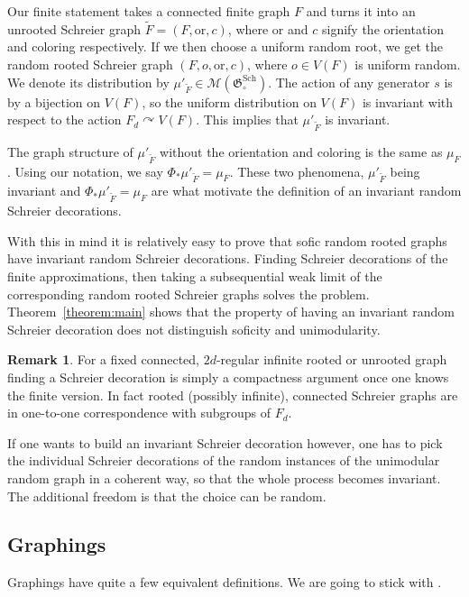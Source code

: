 \documentclass[11pt]{article}
\theoremstyle{definition}
\newtheorem*{rema*}{Remark}
\numberwithin{equation}{section}
\numberwithin{figure}{section}
\numberwithin{table}{section}
\newcommand{\clM}{\mathcal{M}}
\newcommand{\GoG}{\mathfrak{G}}
\newcommand{\orl}{\mathrm{or}}
\DeclareMathOperator{\Sch}{Sch}
\newcommand{\acts}{\curvearrowright}
\begin{document}
Our finite statement takes a connected finite graph $F$ and turns it into an unrooted Schreier graph $\widetilde{F}=(F, \orl, c)$, where $\orl$ and $c$ signify the orientation and coloring respectively. If we then choose a uniform random root, we get the random rooted Schreier graph $(F, o, \orl, c)$, where $o \in V(F)$ is uniform random. We denote its distribution by $\mu'_{\widetilde{F}} \in \clM(\GoG_{\circ}^{\Sch})$. The action of any generator $s$ is by a bijection on $V(F)$, so the uniform distribution on $V(F)$ is invariant with respect to the action $F_d \acts V(F)$. This implies that $\mu'_{\widetilde{F}}$ is invariant.

The graph structure of $\mu'_{\widetilde{F}}$ without the orientation and coloring is the same as $\mu_F$. Using our notation, we say $\Phi_{*} \mu'_{\widetilde{F}} = \mu_F$. These two phenomena, $\mu'_{\widetilde{F}}$ being invariant and $\Phi_{*} \mu'_{\widetilde{F}} = \mu_F$ are what motivate the definition of an invariant random Schreier decorations.

With this in mind it is relatively easy to prove that sofic random rooted graphs have invariant random Schreier decorations. Finding Schreier decorations of the finite approximations, then taking a subsequential weak limit of the corresponding random rooted Schreier graphs solves the problem. Theorem~\ref{theorem:main} shows that the property of having an invariant random Schreier decoration does not distinguish soficity and unimodularity.

\begin{rema*}
For a fixed connected, $2d$-regular infinite rooted or unrooted graph finding a Schreier decoration is simply a compactness argument once one knows the finite version. In fact rooted (possibly infinite), connected Schreier graphs are in one-to-one correspondence with subgroups of $F_d$.

If one wants to build an invariant Schreier decoration however, one has to pick the individual Schreier decorations of the random instances of the unimodular random graph in a coherent way, so that the whole process becomes invariant. The additional freedom is that the choice can be random.
\end{rema*}

\subsection{Graphings}

Graphings have quite a few equivalent definitions. We are going to stick with \cite{lovasz2012large}.
\end{document}
